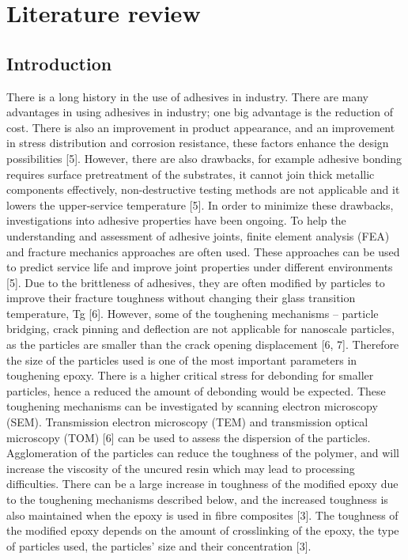 \documentclass[numbers=noendperiod,chapterprefix=on]{icldt} %
\begin{document}


\chapter{Literature review}
\section{Introduction}
There is a long history in the use of adhesives in industry. There are many advantages in using adhesives in industry; one big advantage is the reduction of cost. There is also an improvement in product appearance, and an improvement in stress distribution and corrosion resistance, these factors enhance the design possibilities [5]. However, there are also drawbacks, for example adhesive bonding requires surface pretreatment of the substrates, it cannot join thick metallic components effectively, non-destructive testing methods are not applicable and it lowers the upper-service temperature [5]. 
In order to minimize these drawbacks, investigations into adhesive properties have been ongoing. To help the understanding and assessment of adhesive joints, finite element analysis (FEA) and fracture mechanics approaches are often used. These approaches can be used to predict service life and improve joint properties under different environments [5]. 
Due to the brittleness of adhesives, they are often modified by particles to improve their fracture toughness without changing their glass transition temperature, Tg [6]. However, some of the toughening mechanisms – particle bridging, crack pinning and deflection are not applicable for nanoscale particles, as the particles are smaller than the crack opening displacement [6, 7]. Therefore the size of the particles used is one of the most important parameters in toughening epoxy. There is a higher critical stress for debonding for smaller particles, hence a reduced the amount of debonding would be expected. These toughening mechanisms can be investigated by scanning electron microscopy (SEM). Transmission electron microscopy (TEM) and transmission optical microscopy (TOM) [6] can be used to assess the dispersion of the particles. Agglomeration of the particles can reduce the toughness of the polymer, and will increase the viscosity of the uncured resin which may lead to processing difficulties. There can be a large increase in toughness of the modified epoxy due to the toughening mechanisms described below, and the increased toughness is also maintained when the epoxy is used in fibre composites [3]. The toughness of the modified epoxy depends on the amount of crosslinking of the epoxy, the type of particles used, the particles’ size and their concentration [3]. 
\end{document}
